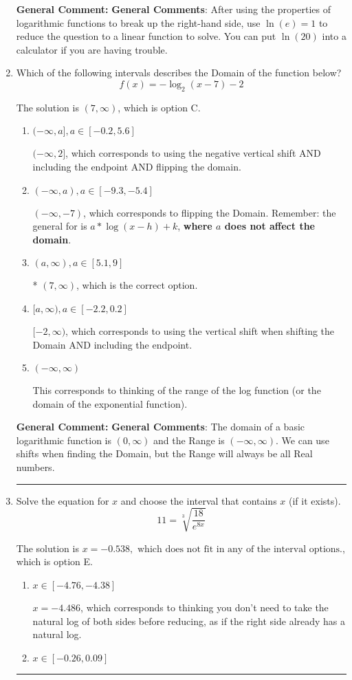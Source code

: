 \documentclass{extbook}[14pt]
\newcommand{\litem}[1]{\item #1

\rule{\textwidth}{0.4pt}}
\begin{document}
\begin{enumerate}
{\textbf{General Comment:} \textbf{General Comments}: After using the properties of logarithmic functions to break up the right-hand side, use $\ln(e) = 1$ to reduce the question to a linear function to solve. You can put $\ln(20)$ into a calculator if you are having trouble.
}
\litem{
Which of the following intervals describes the Domain of the function below?
\[ f(x) = -\log_2{(x-7)}-2 \]

The solution is \( (7, \infty) \), which is option C.\begin{enumerate}[label=\Alph*.]
\item \( (-\infty, a], a \in [-0.2, 5.6] \)

$(-\infty, 2]$, which corresponds to using the negative vertical shift AND including the endpoint AND flipping the domain.
\item \( (-\infty, a), a \in [-9.3, -5.4] \)

$(-\infty, -7)$, which corresponds to flipping the Domain. Remember: the general for is $a*\log(x-h)+k$, \textbf{where $a$ does not affect the domain}.
\item \( (a, \infty), a \in [5.1, 9] \)

* $(7, \infty)$, which is the correct option.
\item \( [a, \infty), a \in [-2.2, 0.2] \)

$[-2, \infty)$, which corresponds to using the vertical shift when shifting the Domain AND including the endpoint.
\item \( (-\infty, \infty) \)

This corresponds to thinking of the range of the log function (or the domain of the exponential function).
\end{enumerate}

\textbf{General Comment:} \textbf{General Comments}: The domain of a basic logarithmic function is $(0, \infty)$ and the Range is $(-\infty, \infty)$. We can use shifts when finding the Domain, but the Range will always be all Real numbers.
}
\litem{
 Solve the equation for $x$ and choose the interval that contains $x$ (if it exists).
\[  11 = \sqrt[3]{\frac{18}{e^{8x}}} \]

The solution is \( x = -0.538, \text{ which does not fit in any of the interval options.} \), which is option E.\begin{enumerate}[label=\Alph*.]
\item \( x \in [-4.76, -4.38] \)

$x = -4.486$, which corresponds to thinking you don't need to take the natural log of both sides before reducing, as if the right side already has a natural log.
\item \( x \in [-0.26, 0.09] \)


\end{enumerate}}
\end{enumerate}
\end{document}
